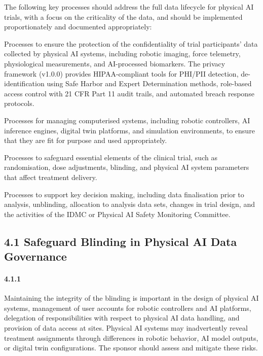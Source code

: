 \documentclass[11pt]{article}
\begin{document}
The following key processes should address the full data lifecycle for physical AI trials, with a focus on the criticality of the data, and should be implemented proportionately and documented appropriately:

\begin{description}[leftmargin=2.5cm,style=sameline]

\item[(a)] Processes to ensure the protection of the confidentiality of trial participants' data collected by physical AI systems, including robotic imaging, force telemetry, physiological measurements, and AI-processed biomarkers. The privacy framework (v1.0.0) provides HIPAA-compliant tools for PHI/PII detection, de-identification using Safe Harbor and Expert Determination methods, role-based access control with 21 CFR Part 11 audit trails, and automated breach response protocols.

\item[(b)] Processes for managing computerised systems, including robotic controllers, AI inference engines, digital twin platforms, and simulation environments, to ensure that they are fit for purpose and used appropriately.

\item[(c)] Processes to safeguard essential elements of the clinical trial, such as randomisation, dose adjustments, blinding, and physical AI system parameters that affect treatment delivery.

\item[(d)] Processes to support key decision making, including data finalisation prior to analysis, unblinding, allocation to analysis data sets, changes in trial design, and the activities of the IDMC or Physical AI Safety Monitoring Committee.

\end{description}

\subsection{4.1 Safeguard Blinding in Physical AI Data Governance}

\paragraph{4.1.1} Maintaining the integrity of the blinding is important in the design of physical AI systems, management of user accounts for robotic controllers and AI platforms, delegation of responsibilities with respect to physical AI data handling, and provision of data access at sites. Physical AI systems may inadvertently reveal treatment assignments through differences in robotic behavior, AI model outputs, or digital twin configurations. The sponsor should assess and mitigate these risks.
\end{document}
